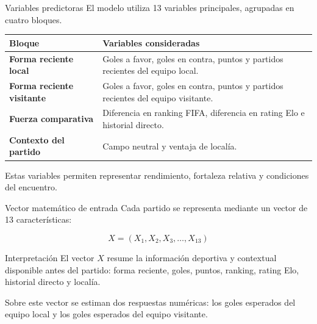 \documentclass[aspectratio=169]{beamer}
\begin{document}
\begin{frame}{Variables predictoras}
\justifying
El modelo utiliza 13 variables principales, agrupadas en cuatro bloques.

\vspace{0.2cm}
\begin{tabularx}{\textwidth}{>{\bfseries}p{}X}
\toprule
Bloque & Variables consideradas \\
\midrule
Forma reciente local & Goles a favor, goles en contra, puntos y partidos recientes del equipo local.\\
Forma reciente visitante & Goles a favor, goles en contra, puntos y partidos recientes del equipo visitante.\\
Fuerza comparativa & Diferencia en ranking FIFA, diferencia en rating Elo e historial directo.\\
Contexto del partido & Campo neutral y ventaja de localía.\\
\bottomrule
\end{tabularx}

\vspace{0.3cm}
Estas variables permiten representar rendimiento, fortaleza relativa y condiciones del encuentro.
\end{frame}

\begin{frame}{Vector matemático de entrada}
\justifying
Cada partido se representa mediante un vector de 13 características:

\[
X = (X_1, X_2, X_3, \dots, X_{13})
\]

\vspace{0.15cm}
\begin{block}{Interpretación}
El vector $X$ resume la información deportiva y contextual disponible antes del partido: forma reciente, goles, puntos, ranking, rating Elo, historial directo y localía.
\end{block}

\vspace{0.2cm}
Sobre este vector se estiman dos respuestas numéricas: los goles esperados del equipo local y los goles esperados del equipo visitante.
\end{frame}
\end{document}
